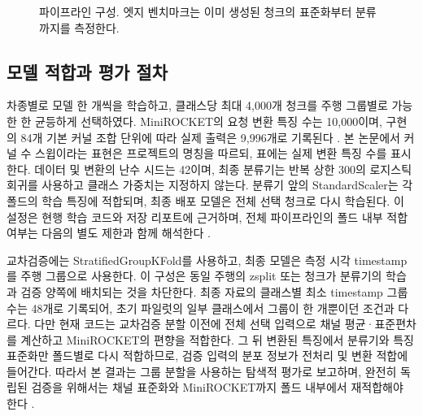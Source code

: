 \documentclass[11pt,a4paper]{article}
\newcommand{\sourceproject}{\citep{project2026}}
\begin{document}
\begin{figure}[htbp]
\centering
{}
\caption{파이프라인 구성. 엣지 벤치마크는 이미 생성된 청크의 표준화부터 분류까지를 측정한다.}
\label{fig:pipeline}
\end{figure}

\subsection{모델 적합과 평가 절차}
차종별로 모델 한 개씩을 학습하고, 클래스당 최대 4,000개 청크를 주행 그룹별로 가능한 한 균등하게 선택하였다.
MiniROCKET의 요청 변환 특징 수는 10,000이며, 구현의 84개 기본 커널 조합 단위에 따라 실제 출력은 9,996개로 기록된다 \citep{sktime2026}.
본 논문에서 커널 수 스윕이라는 표현은 프로젝트의 명칭을 따르되, 표에는 실제 변환 특징 수를 표시한다.
데이터 및 변환의 난수 시드는 42이며, 최종 분류기는 반복 상한 300의 로지스틱 회귀를 사용하고 클래스 가중치는 지정하지 않는다.
분류기 앞의 StandardScaler는 각 폴드의 학습 특징에 적합되며, 최종 배포 모델은 전체 선택 청크로 다시 학습된다.
이 설정은 현행 학습 코드와 저장 리포트에 근거하며, 전체 파이프라인의 폴드 내부 적합 여부는 다음의 별도 제한과 함께 해석한다 \sourceproject.

교차검증에는 StratifiedGroupKFold를 사용하고, 최종 모델은 측정 시각 timestamp를 주행 그룹으로 사용한다.
이 구성은 동일 주행의 zsplit 또는 청크가 분류기의 학습과 검증 양쪽에 배치되는 것을 차단한다.
최종 자료의 클래스별 최소 timestamp 그룹 수는 48개로 기록되어, 초기 파일럿의 일부 클래스에서 그룹이 한 개뿐이던 조건과 다르다.
다만 현재 코드는 교차검증 분할 이전에 전체 선택 입력으로 채널 평균·표준편차를 계산하고 MiniROCKET의 편향을 적합한다.
그 뒤 변환된 특징에서 분류기와 특징 표준화만 폴드별로 다시 적합하므로, 검증 입력의 분포 정보가 전처리 및 변환 적합에 들어간다.
따라서 본 결과는 그룹 분할을 사용하는 탐색적 평가로 보고하며, 완전히 독립된 검증을 위해서는 채널 표준화와 MiniROCKET까지 폴드 내부에서 재적합해야 한다 \citep{sklearn2026}.
\end{document}
